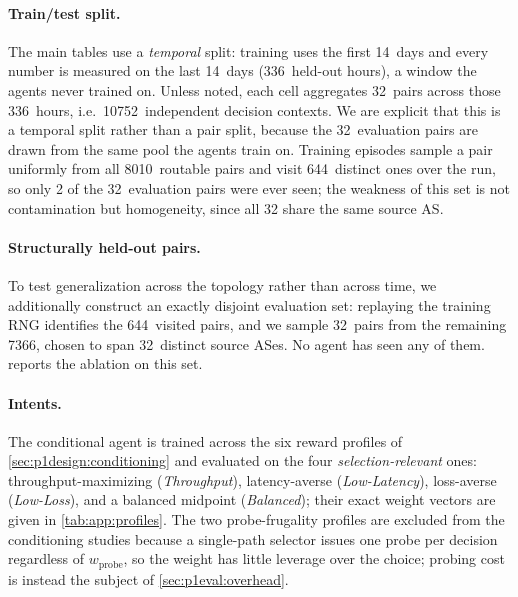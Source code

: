 \paragraph{Train/test split.} The main tables use a \emph{temporal} split: training uses the first
14~days and every number is measured on the last 14~days (336~held-out hours), a window the agents never
trained on. Unless noted, each cell aggregates 32~pairs across those 336~hours, i.e.\ 10752~independent
decision contexts. We are explicit that this is a temporal split rather than a pair split, because the
32~evaluation pairs are drawn from the same pool the agents train on. Training episodes sample a pair
uniformly from all 8010~routable pairs and visit 644~distinct ones over the run, so only 2 of the
32~evaluation pairs were ever seen; the weakness of this set is not contamination but homogeneity, since
all 32 share the same source AS.

\paragraph{Structurally held-out pairs.} To test generalization across the topology rather than across
time, we additionally construct an exactly disjoint evaluation set: replaying the training RNG identifies
the 644~visited pairs, and we sample 32~pairs from the remaining 7366, chosen to span 32~distinct source
ASes. No agent has seen any of them.  reports the ablation on this set.

\paragraph{Intents.} The conditional agent is trained across the six reward profiles of
\cref{sec:p1design:conditioning} and evaluated on the four \emph{selection-relevant} ones:
throughput-maximizing (\emph{Throughput}), latency-averse (\emph{Low-Latency}), loss-averse
(\emph{Low-Loss}), and a balanced midpoint (\emph{Balanced}); their exact weight vectors are given in
\cref{tab:app:profiles}. The two probe-frugality profiles are excluded from the conditioning studies
because a single-path selector issues one probe per decision regardless of $w_{\text{probe}}$, so the
weight has little leverage over the choice; probing cost is instead the subject of
\cref{sec:p1eval:overhead}.


